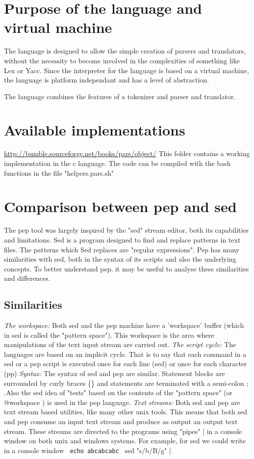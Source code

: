 \documentclass[a4paper,12pt]{article}
\begin{document}
\section{Purpose of the language and virtual machine}

 The language is designed to allow the simple creation of parsers and
 translators, without the necessity to become involved in the complexities of
 something like Lex or Yacc. Since the interpreter for the language is based
 on a virtual machine, the language is platform independant and has a level
 of abstraction.

 The language combines the features of a tokenizer and parser and
 translator.

\section{Available implementations}

 \url{http://bumble.sourceforge.net/books/pars/object/}
   This folder contains a working implementation in the c language.
   The code can be compiled with the bash functions in the file
   "helpers.pars.sh"
 
\section{Comparison between pep and sed}

 The pep tool was largely inspired by the "sed" stream editor, both its
 capabilities and limitations. Sed is a program designed to find and replace
 patterns in text files. The patterns which Sed replaces are "regular
 expressions". Pep has many similarities with sed, both in the syntax of
 its scripts and also the underlying concepts. To better understand pep,
 it may be useful to analyse these similarities and differences.

\subsection{Similarities}
 \emph{ The workspace: }
    Both sed and the pep machine have a 'workspace' buffer (which in sed is
    called the "pattern space"). This workspace is the area where
    manipulations of the text input stream are carried out.
 \emph{ The script cycle: }
    The languages are based on an implicit cycle. That is to say
    that each command in a sed or a pep script is executed once
    for each line (sed) or once for each character (pp)
 \emph{ Syntax: }
    The syntax of sed and pep are similar. Statement blocks are
    surrounded by curly braces \{\} and statements are terminated with
    a semi-colon ; .Also the sed idea of "tests" based on the contents
    of the "pattern space" (or @workspace ) is used in the pep
    language.
 \emph{ Text streams: }
    Both sed and pep are text stream based utilities, like many
    other unix tools. This means that both sed and pep consume an
    input text stream and produce as output an output text stream.
    These streams are directed to the programs using "pipes" | in a
    console window on both unix and windows systems. For example, for
    sed we could write in a console window 
 \verb| echo abcabcabc | sed "s/b/B/g" |
\end{document}
